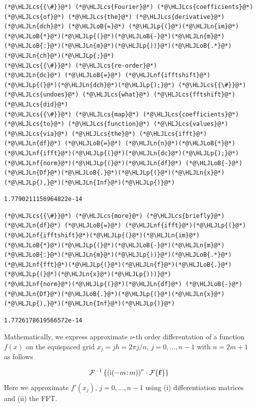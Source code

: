 \documentclass[12pt,landscape]{article}
\newcommand{\HLJLn}[1]{#1}
\newcommand{\HLJLnf}[1]{\textcolor[RGB]{66,102,213}{#1}}
\newcommand{\HLJLoB}[1]{\textcolor[RGB]{102,102,102}{\textbf{#1}}}
\newcommand{\HLJLp}[1]{#1}
\newcommand{\HLJLcs}[1]{\textcolor[RGB]{153,153,119}{\textit{#1}}}
\begin{document}
{\begin{lstlisting}
(*@\HLJLcs{{\#}}@*) (*@\HLJLcs{Fourier}@*) (*@\HLJLcs{coefficients}@*) (*@\HLJLcs{of}@*) (*@\HLJLcs{the}@*) (*@\HLJLcs{derivative}@*)
(*@\HLJLn{dch}@*) (*@\HLJLoB{=}@*) (*@\HLJLp{(}@*)(*@\HLJLn{im}@*)(*@\HLJLoB{*}@*)(*@\HLJLp{(}@*)(*@\HLJLoB{-}@*)(*@\HLJLn{m}@*)(*@\HLJLoB{:}@*)(*@\HLJLn{m}@*)(*@\HLJLp{))}@*)(*@\HLJLoB{.*}@*)(*@\HLJLn{ch}@*)(*@\HLJLp{;}@*)
(*@\HLJLcs{{\#}}@*) (*@\HLJLcs{re-order}@*)
(*@\HLJLn{dc}@*) (*@\HLJLoB{=}@*) (*@\HLJLnf{ifftshift}@*)(*@\HLJLp{(}@*)(*@\HLJLn{dch}@*)(*@\HLJLp{);}@*) (*@\HLJLcs{{\#}}@*) (*@\HLJLcs{undoes}@*) (*@\HLJLcs{what}@*) (*@\HLJLcs{fftshift}@*) (*@\HLJLcs{did}@*)
(*@\HLJLcs{{\#}}@*) (*@\HLJLcs{map}@*) (*@\HLJLcs{coefficients}@*) (*@\HLJLcs{to}@*) (*@\HLJLcs{function}@*) (*@\HLJLcs{values}@*) (*@\HLJLcs{via}@*) (*@\HLJLcs{the}@*) (*@\HLJLcs{ifft}@*)
(*@\HLJLn{df}@*) (*@\HLJLoB{=}@*) (*@\HLJLn{n}@*)(*@\HLJLoB{*}@*)(*@\HLJLnf{ifft}@*)(*@\HLJLp{(}@*)(*@\HLJLn{dc}@*)(*@\HLJLp{);}@*)
(*@\HLJLnf{norm}@*)(*@\HLJLp{(}@*)(*@\HLJLn{df}@*) (*@\HLJLoB{-}@*) (*@\HLJLn{Df}@*)(*@\HLJLoB{.}@*)(*@\HLJLp{(}@*)(*@\HLJLn{x}@*)(*@\HLJLp{),}@*)(*@\HLJLn{Inf}@*)(*@\HLJLp{)}@*)
\end{lstlisting}

\begin{lstlisting}
1.7790211156964822e-14
\end{lstlisting}


\begin{lstlisting}
(*@\HLJLcs{{\#}}@*) (*@\HLJLcs{more}@*) (*@\HLJLcs{briefly}@*)
(*@\HLJLn{df}@*) (*@\HLJLoB{=}@*) (*@\HLJLnf{ifft}@*)(*@\HLJLp{(}@*)(*@\HLJLnf{ifftshift}@*)(*@\HLJLp{(}@*)(*@\HLJLn{im}@*)(*@\HLJLoB{*}@*)(*@\HLJLp{(}@*)(*@\HLJLoB{-}@*)(*@\HLJLn{m}@*)(*@\HLJLoB{:}@*)(*@\HLJLn{m}@*)(*@\HLJLp{))}@*)(*@\HLJLoB{.*}@*)(*@\HLJLnf{fft}@*)(*@\HLJLp{(}@*)(*@\HLJLn{f}@*)(*@\HLJLoB{.}@*)(*@\HLJLp{(}@*)(*@\HLJLn{x}@*)(*@\HLJLp{)))}@*)
(*@\HLJLnf{norm}@*)(*@\HLJLp{(}@*)(*@\HLJLn{df}@*) (*@\HLJLoB{-}@*) (*@\HLJLn{Df}@*)(*@\HLJLoB{.}@*)(*@\HLJLp{(}@*)(*@\HLJLn{x}@*)(*@\HLJLp{),}@*)(*@\HLJLn{Inf}@*)(*@\HLJLp{)}@*)
\end{lstlisting}

\begin{lstlisting}
1.7726178619566572e-14
\end{lstlisting}


Mathematically, we express approximate $\nu$-th order differentation of a function $f(x)$ on the equispaced grid $x_j = jh = 2\pi j/n$, $j = 0, \ldots, n-1$ with $n = 2m + 1$ as follows

\[
\mathcal{F}^{-1}\left\lbrace\left({\rm i}(-m\!:\!m)\right)^{\nu}\cdot\mathcal{F}\lbrace \mathbf{f} \rbrace\right\rbrace
\]
Here we approximate $f'(x_j)$, $j = 0, \ldots, n-1$ using (i) differentiation matrices and (ii) the FFT.


}
\end{document}
